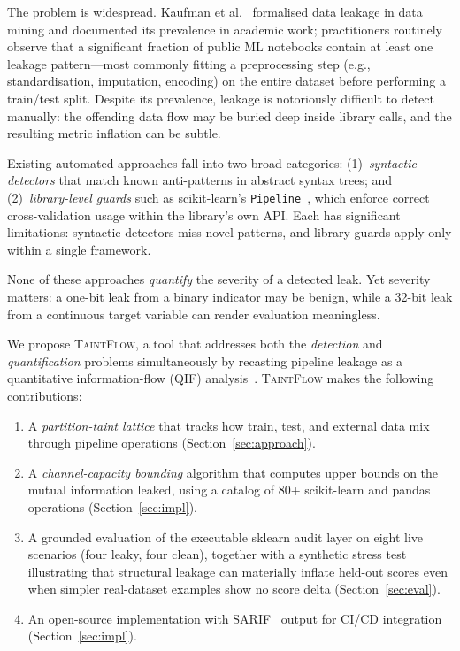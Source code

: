\documentclass[11pt]{article}
\begin{document}
The problem is widespread.  Kaufman et al.~\cite{kaufman2012}
formalised data leakage in data mining and documented its prevalence
in academic work; practitioners routinely observe that a significant
fraction of public ML notebooks contain at least one leakage
pattern---most commonly fitting a preprocessing step (e.g.,
standardisation, imputation, encoding) on the entire dataset before
performing a train/test split.  Despite its prevalence, leakage is
notoriously difficult to detect manually: the offending data flow may
be buried deep inside library calls, and the resulting metric
inflation can be subtle.

Existing automated approaches fall into two broad categories:
(1)~\emph{syntactic detectors} that match known anti-patterns in
abstract syntax trees; and
(2)~\emph{library-level guards} such as scikit-learn's
\texttt{Pipeline}~\cite{pedregosa2011}, which enforce correct
cross-validation usage within the library's own API.
Each has significant limitations: syntactic detectors miss novel
patterns, and library guards apply only within a single framework.

None of these approaches \emph{quantify} the severity of a detected
leak.  Yet severity matters: a one-bit leak from a binary indicator
may be benign, while a 32-bit leak from a continuous target variable
can render evaluation meaningless.

We propose \textsc{TaintFlow}, a tool that addresses both the
\emph{detection} and \emph{quantification} problems simultaneously by
recasting pipeline leakage as a quantitative information-flow (QIF)
analysis~\cite{smith2009,alvim2020}.  \textsc{TaintFlow} makes the
following contributions:

\begin{enumerate}
  \item A \emph{partition-taint lattice} that tracks how train, test,
    and external data mix through pipeline operations
    (Section~\ref{sec:approach}).
  \item A \emph{channel-capacity bounding} algorithm that computes
    upper bounds on the mutual information leaked, using a catalog of
    80+ scikit-learn and pandas operations
    (Section~\ref{sec:impl}).
  \item A grounded evaluation of the executable sklearn audit layer on
    eight live scenarios (four leaky, four clean), together with a
    synthetic stress test illustrating that structural leakage can
    materially inflate held-out scores even when simpler real-dataset
    examples show no score delta (Section~\ref{sec:eval}).
  \item An open-source implementation with SARIF~\cite{sarif2020}
    output for CI/CD integration (Section~\ref{sec:impl}).
\end{enumerate}
\end{document}
